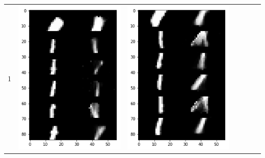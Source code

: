 \documentclass[12pt]{report} %
\begin{document}
\begin{tabular}{m{0.7cm}m{2.4cm}m{2.4cm}m{2.4cm}m{2.4cm}m{2.4cm}m{2.4cm}}
1 & \includegraphics[scale=0.3]{pictures/KE_1_up.png} & \includegraphics[scale=0.3]{pictures/KE_1_down.png} &

\end{tabular}
\end{document}
